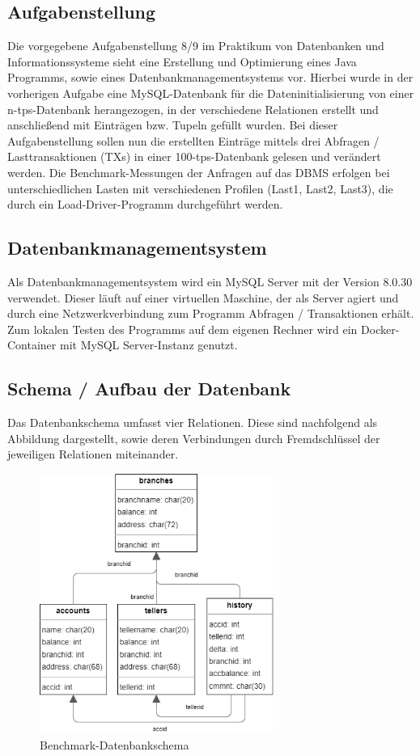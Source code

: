 \subsection{Aufgabenstellung}\label{subsec:aufgabenstellung}
Die vorgegebene Aufgabenstellung 8/9 im Praktikum von Datenbanken und Informationssysteme sieht eine Erstellung und Optimierung eines Java Programms, sowie eines Datenbankmanagementsystems vor.
Hierbei wurde in der vorherigen Aufgabe eine MySQL-Datenbank für die Dateninitialisierung von einer n-tps-Datenbank herangezogen, in der verschiedene Relationen erstellt und anschließend mit Einträgen bzw. Tupeln gefüllt wurden.
Bei dieser Aufgabenstellung sollen nun die erstellten Einträge mittels drei Abfragen / Lasttransaktionen (TXs) in einer 100-tps-Datenbank gelesen und verändert werden.
Die Benchmark-Messungen der Anfragen auf das DBMS erfolgen bei unterschiedlichen Lasten mit verschiedenen Profilen (Last1, Last2, Last3), die durch ein Load-Driver-Programm durchgeführt werden.
\subsection{Datenbankmanagementsystem}\label{subsec:datenbankmanagementsystem-einleitung}
Als Datenbankmanagementsystem wird ein MySQL Server mit der Version 8.0.30 verwendet.
Dieser läuft auf einer virtuellen Maschine, der als Server agiert und durch eine Netzwerkverbindung zum Programm Abfragen / Transaktionen erhält.
Zum lokalen Testen des Programms auf dem eigenen Rechner wird ein Docker-Container mit MySQL Server-Instanz genutzt.
\subsection{Schema / Aufbau der Datenbank}\label{subsec:schema/aufbau}
Das Datenbankschema umfasst vier Relationen.
Diese sind nachfolgend als Abbildung dargestellt, sowie deren Verbindungen durch Fremdschlüssel der jeweiligen Relationen miteinander.
\begin{figure}[h!]
    \center
    \includegraphics[height=8.5cm]{assets/img/benchmark-datenbank-schema}
    \caption{Benchmark-Datenbankschema}
    \label{fig:benchmark-datenbankschema}
\end{figure}
